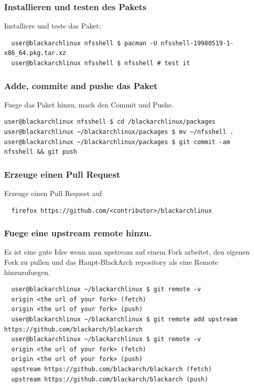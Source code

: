 \documentclass[a4paper, oneside, 11pt]{book}
\def\href#1#2{\htmladdnormallink{#2}{#1}}
\begin{document}
\subsubsection{Installieren und testen des Pakets}
Installiere und teste das Paket:
\begin{lstlisting}
  user@blackarchlinux nfsshell $ pacman -U nfsshell-19980519-1-x86_64.pkg.tar.xz
  user@blackarchlinux nfsshell $ nfsshell # test it
\end{lstlisting}

\subsubsection{Adde, commite and pushe das Paket}
Fuege das Paket hinzu, mach den Commit und Pushe.
\begin{lstlisting}user@blackarchlinux nfsshell $ cd /blackarchlinux/packages
user@blackarchlinux ~/blackarchlinux/packages $ mv ~/nfsshell .
user@blackarchlinux ~/blackarchlinux/packages $ git commit -am nfsshell && git push
\end{lstlisting}

\subsubsection{Erzeuge einen Pull Request}
Erzeuge einen Pull Request auf \href{https://github.com/}{github.com}
\begin{lstlisting}
  firefox https://github.com/<contributor>/blackarchlinux
\end{lstlisting}

\subsubsection{Fuege eine upstream remote hinzu.}
Es ist eine gute Idee wenn man upstream auf einem Fork arbeitet, den eigenen Fork zu pullen und das Haupt-BlackArch repository 
als eine Remote hinzuzufuegen.
\begin{lstlisting}
  user@blackarchlinux ~/blackarchlinux $ git remote -v
  origin <the url of your fork> (fetch)
  origin <the url of your fork> (push)
  user@blackarchlinux ~/blackarchlinux $ git remote add upstream https://github.com/blackarch/blackarch
  user@blackarchlinux ~/blackarchlinux $ git remote -v
  origin <the url of your fork> (fetch)
  origin <the url of your fork> (push)
  upstream https://github.com/blackarch/blackarch (fetch)
  upstream https://github.com/blackarch/blackarch (push)
\end{lstlisting}
\end{document}
